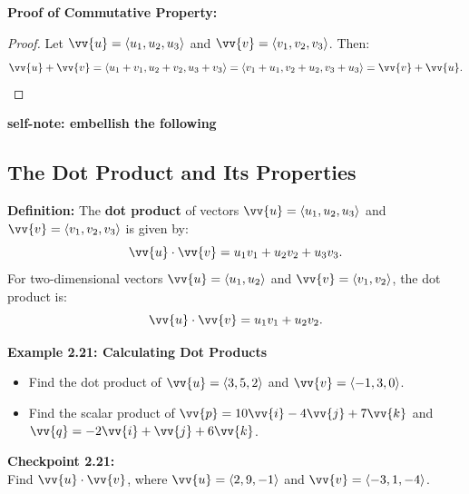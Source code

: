 \documentclass{article}
\begin{document}
\begin{proofbox}
    \textbf{Proof of Commutative Property:}
    \begin{proof}
    Let \(\vv{u} = \langle u_1, u_2, u_3 \rangle\) and \(\vv{v} = \langle v_1, v_2, v_3 \rangle\). Then:
    \[
    \vv{u} + \vv{v} = \langle u_1 + v_1, u_2 + v_2, u_3 + v_3 \rangle = \langle v_1 + u_1, v_2 + u_2, v_3 + u_3 \rangle = \vv{v} + \vv{u}.
    \]
    \end{proof}
\end{proofbox}

\textbf{self-note: embellish the following}

\subsection*{The Dot Product and Its Properties}

\begin{definitionbox}
    \textbf{Definition:} The \textbf{dot product} of vectors \(\vv{u} = \langle u_1, u_2, u_3 \rangle\) and \(\vv{v} = \langle v_1, v_2, v_3 \rangle\) is given by:
    \[
    \vv{u} \cdot \vv{v} = u_1 v_1 + u_2 v_2 + u_3 v_3.
    \]
    For two-dimensional vectors \(\vv{u} = \langle u_1, u_2 \rangle\) and \(\vv{v} = \langle v_1, v_2 \rangle\), the dot product is:
    \[
    \vv{u} \cdot \vv{v} = u_1 v_1 + u_2 v_2.
    \]
\end{definitionbox}

\begin{examplebox}
    \textbf{Example 2.21: Calculating Dot Products} \\
    \begin{itemize}
        \item Find the dot product of \(\vv{u} = \langle 3, 5, 2 \rangle\) and \(\vv{v} = \langle -1, 3, 0 \rangle\).
        \item Find the scalar product of \(\vv{p} = 10\vv{i} - 4\vv{j} + 7\vv{k}\) and \(\vv{q} = -2\vv{i} + \vv{j} + 6\vv{k}\).
    \end{itemize}
\end{examplebox}

\begin{exercisebox}
    \textbf{Checkpoint 2.21:} \\
    Find \(\vv{u} \cdot \vv{v}\), where \(\vv{u} = \langle 2, 9, -1 \rangle\) and \(\vv{v} = \langle -3, 1, -4 \rangle\).
\end{exercisebox}
\end{document}
